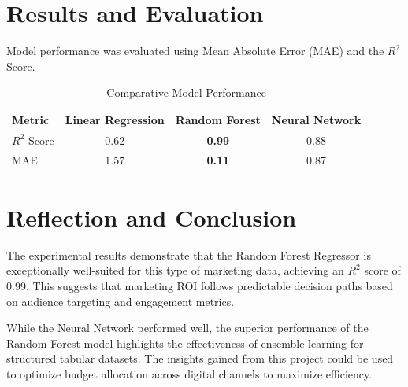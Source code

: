 \documentclass[12pt]{article}
\begin{document}
\section{Results and Evaluation}
Model performance was evaluated using Mean Absolute Error (MAE) and the $R^2$ Score.

\begin{table}[H]
\centering
\caption{Comparative Model Performance}
\begin{tabular}{lccc}
\toprule
Metric & Linear Regression & Random Forest & Neural Network \\
\midrule
$R^2$ Score & 0.62 & \textbf{0.99} & 0.88 \\
MAE & 1.57 & \textbf{0.11} & 0.87 \\
\bottomrule
\end{tabular}
\end{table}

\section{Reflection and Conclusion}
The experimental results demonstrate that the Random Forest Regressor is exceptionally well-suited for this type of marketing data, achieving an $R^2$ score of 0.99. This suggests that marketing ROI follows predictable decision paths based on audience targeting and engagement metrics. 

While the Neural Network performed well, the superior performance of the Random Forest model highlights the effectiveness of ensemble learning for structured tabular datasets. The insights gained from this project could be used to optimize budget allocation across digital channels to maximize efficiency.
\end{document}
